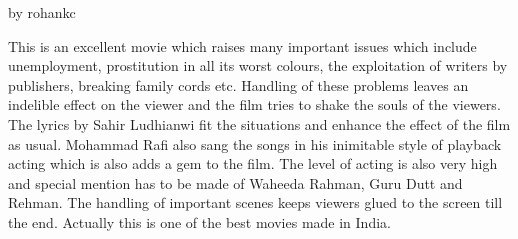 \documentclass{article}
\begin{document}
by rohankc

This is an excellent movie which raises many important issues which include unemployment, prostitution in all its worst colours, the exploitation of writers by publishers, breaking family cords etc. Handling of these problems leaves an indelible effect on the viewer and the film tries to shake the souls of the viewers. The lyrics by Sahir Ludhianwi fit the situations and enhance the effect of the film as usual. Mohammad Rafi also sang the songs in his inimitable style of playback acting which is also adds a gem to the film. The level of acting is also very high and special mention has to be made of Waheeda Rahman, Guru Dutt and Rehman. The handling of important scenes keeps viewers glued to the screen till the end. Actually this is one of the best movies made in India. 
\end{document}
